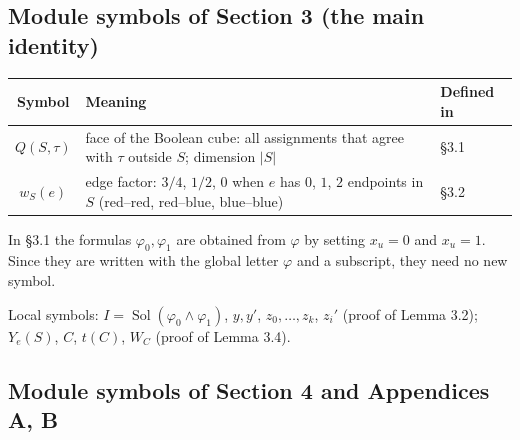 ﻿\documentclass[10pt,a4paper]{article}
\DeclareMathOperator{\Sol}{Sol}
\begin{document}
\subsection{Module symbols of Section 3 (the main identity)}

\begin{longtable}{SMW}
\toprule
Symbol & Meaning & Defined in \\
\midrule
\endhead
\(Q(S,\tau)\) & face of the Boolean cube: all assignments that agree with \(\tau\) outside \(S\); dimension \(|S|\) & \S3.1 \\
\(w_S(e)\) & edge factor: \(3/4\), \(1/2\), \(0\) when \(e\) has \(0\), \(1\), \(2\) endpoints in \(S\) (red--red, red--blue, blue--blue) & \S3.2 \\
\bottomrule
\end{longtable}

In \S3.1 the formulas \(\varphi_0,\varphi_1\) are obtained from \(\varphi\) by
setting \(x_u=0\) and \(x_u=1\). Since they are written with the global letter
\(\varphi\) and a subscript, they need no new symbol.

Local symbols: \(I=\Sol(\varphi_0\wedge\varphi_1)\), \(y,y'\),
\(z_0,\ldots,z_k\), \(z_i'\) (proof of Lemma 3.2); \(Y_e(S)\), \(C\), \(t(C)\),
\(W_C\) (proof of Lemma 3.4).

\subsection{Module symbols of Section 4 and Appendices A, B}\label{subsec:sym-4}
\end{document}
